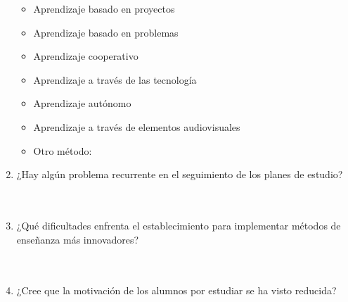 \documentclass{article}
\begin{document}
\begin{enumerate}
        \begin{itemize}[label=$\square$]
            \item Aprendizaje basado en proyectos
            \item Aprendizaje basado en problemas
            \item Aprendizaje cooperativo
            \item Aprendizaje a través de las tecnología
            \item Aprendizaje autónomo
            \item Aprendizaje a través de elementos audiovisuales
            \item Otro método: \underline{\hspace{0.5\linewidth}}
        \end{itemize}
    \item ¿Hay algún problema recurrente en el seguimiento de los planes de estudio? \\[0.5cm]
        \underline{\hspace{0.95\linewidth}} \vspace{0.3cm} \\
        \underline{\hspace{0.95\linewidth}} \vspace{0.3cm} \\
        \underline{\hspace{0.95\linewidth}} \vspace{0.3cm}
    \item ¿Qué dificultades enfrenta el establecimiento para implementar métodos de enseñanza más innovadores? \\[0.5cm]
        \underline{\hspace{0.95\linewidth}} \vspace{0.3cm} \\
        \underline{\hspace{0.95\linewidth}} \vspace{0.3cm} \\
        \underline{\hspace{0.95\linewidth}} \vspace{0.3cm}
    \item ¿Cree que la motivación de los alumnos por estudiar se ha visto reducida? \\[0.5cm]

\end{enumerate}
\end{document}
